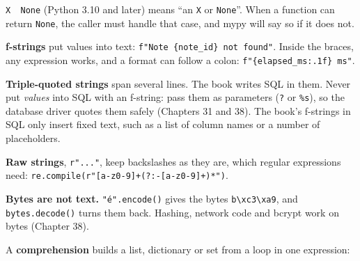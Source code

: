 \noindent{}\texttt{X\ \textbar{}\ None} (Python 3.10 and later) means ``an \texttt{X} or \texttt{None}''. When a function can return \texttt{None}, the caller must handle that case, and mypy will say so if it does not.

\label{44-appendices:g5-strings}

\textbf{f-strings} put values into text: \texttt{f"Note\ \{note\_}\allowbreak{}\texttt{id\}\ not\ found"}. Inside the braces, any expression works, and a format can follow a colon: \texttt{f"\{elapsed\_ms:.1f\}\ ms"}.

\textbf{Triple-quoted strings} span several lines. The book writes SQL in them. Never put \emph{values} into SQL with an f-string: pass them as parameters (\texttt{?} or \texttt{\%s}), so the database driver quotes them safely (Chapters 31 and 38). The book's f-strings in SQL only insert fixed text, such as a list of column names or a number of placeholders.

\textbf{Raw strings}, \texttt{r"..."}, keep backslashes as they are, which regular expressions need: \texttt{re.}\allowbreak{}\texttt{compile(r"{[}a-}\allowbreak{}\texttt{z0-}\allowbreak{}\texttt{9{]}+(?}\allowbreak{}\texttt{:}\allowbreak{}\texttt{-}\allowbreak{}\texttt{{[}a-}\allowbreak{}\texttt{z0-}\allowbreak{}\texttt{9{]}+)*")}.

\textbf{Bytes are not text.} \texttt{"é".encode()} gives the bytes \texttt{b\textquotesingle{}\textbackslash{}xc3\textbackslash{}xa9\textquotesingle{}}, and \texttt{bytes.decode()} turns them back. Hashing, network code and bcrypt work on bytes (Chapter 38).

\label{44-appendices:g6-comprehensions-and-built-ins}

A \textbf{comprehension} builds a list, dictionary or set from a loop in one expression:

\begin{codebox}[short]

\begin{Shaded}
\begin{Highlighting}[]
\OperatorTok{=}\NormalTok{ [row[}\NormalTok{] }\NormalTok{ rows]}
\OperatorTok{=}\NormalTok{ \{note[}\NormalTok{]: note }
\OperatorTok{=}\NormalTok{ [note } \NormalTok{(note[}\NormalTok{]) }\OperatorTok{\textgreater{}} \NormalTok{]}
\end{Highlighting}
\end{Shaded}

\end{codebox}

